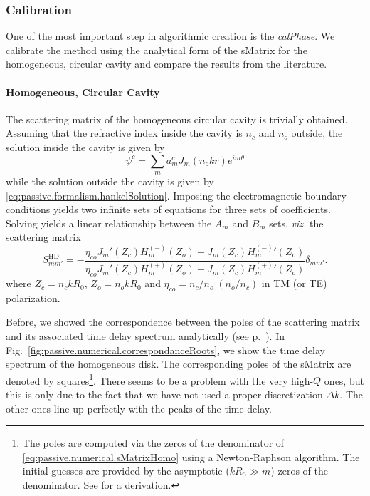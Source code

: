 \subsubsection{Calibration}
One of the most important step in algorithmic creation
is the \textit{\gls{calPhase}}. We calibrate the method
using the analytical form of the \gls{sMatrix} for the
homogeneous, circular cavity and compare the results 
from the literature. 

\paragraph{Homogeneous, Circular Cavity}
The scattering matrix of the homogeneous circular cavity
is trivially obtained. Assuming that the refractive index inside
the cavity is $n_c$ and $n_o$ outside, the solution inside the 
cavity is given by 
  \begin{equation}
   \psi^c = \sum_m a_m^cJ_m(n_okr)e^{im\theta}
  \end{equation}
while the solution outside the cavity is given by \eqref{eq:passive.formalism.hankelSolution}.
Imposing the electromagnetic boundary conditions yields two infinite sets of equations
for three sets of coefficients. Solving yields a linear relationship between the 
$A_m$ and $B_m$ sets, \textit{viz.} the scattering matrix
  \begin{equation}
   \label{eq:passive.numerical.sMatrixHomo}
   S_{mm'}^\text{HD} = -  \frac{\eta_{co}J_m'(Z_c)H_m^{(-)}(Z_o)-J_m(Z_c){H^{(-)}_m}'(Z_o)}
				{\eta_{co}J_m'(Z_c)H_m^{(+)}(Z_o)-J_m(Z_c){H^{(+)}_m}'(Z_o)}\delta_{mm'}.
  \end{equation}
where $Z_c = n_ckR_0$, $Z_o=n_okR_0$ and $\eta_{co}= n_c/n_o\; (n_o/n_c)$ in TM (or TE) polarization.

Before, we showed the correspondence between the poles of the scattering matrix and its associated
time delay spectrum analytically (see p.~\pageref{eq:passive.formalism.lorentzianDelays}). 
In Fig.~\ref{fig:passive.numerical.correspondanceRoots}, we show the
time delay spectrum of the homogeneous disk. The corresponding poles of the \gls{sMatrix} are denoted
by squares\footnote{The poles are computed via the zeros of the denominator of \eqref{eq:passive.numerical.sMatrixHomo}
using a Newton-Raphson algorithm. The initial guesses are provided by the asymptotic ($kR_0\gg m$) zeros
of the denominator. See \cite[Annexe A.2.4]{GAG2011} for a derivation.}. There seems to be a problem with the very high-$Q$ ones, but this is only due to the fact
that we have not used a proper discretization $\Delta k$. The other ones line up perfectly with the peaks
of the time delay. 

